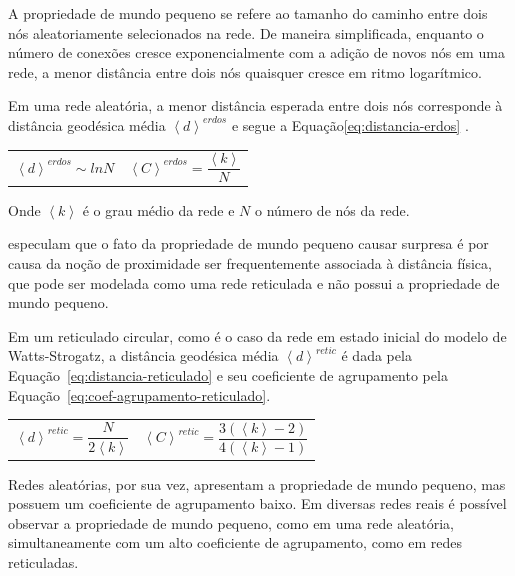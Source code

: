 \documentclass[12pt,a4paper]{article}
\theoremstyle{hypo}
\newcommand{\avg}[1]{\left\langle #1 \right\rangle} %
\begin{document}
A propriedade de mundo pequeno se refere ao tamanho do caminho entre dois nós aleatoriamente selecionados na rede. De maneira simplificada, enquanto o número de conexões cresce exponencialmente com a adição de novos nós em uma rede, a menor distância entre dois nós quaisquer cresce em ritmo logarítmico. 

Em uma rede aleatória, a menor distância esperada entre dois nós corresponde à distância geodésica média $\avg{d}^\textit{erdos}$ e segue a Equação\ref{eq:distancia-erdos} \cite{Barabasi2016-rn}.

\noindent
\begin{tabularx}{\linewidth}{@{}XX@{}}
    \begin{equation} \label{eq:distancia-erdos}
        \avg{d}^\textit{erdos} \sim ln N
    \end{equation} &
    \begin{equation} \label{eq:coef-agrupamento-erdos}
        \avg{C}^\textit{erdos} = \frac{\avg{k}}{N}
    \end{equation}
\end{tabularx}

Onde $\avg{k}$ é o grau médio da rede e $N$ o número de nós da rede.

 especulam que o fato da propriedade de mundo pequeno causar surpresa é por causa da noção de proximidade ser frequentemente associada à distância física, que pode ser modelada como uma rede reticulada e não possui a propriedade de mundo pequeno.

Em um reticulado circular, como é o caso da rede em estado inicial do modelo de Watts-Strogatz, a distância geodésica média $\avg{d}^ \textit{retic}$ é dada pela Equação~\ref{eq:distancia-reticulado} e seu coeficiente de agrupamento pela Equação~\ref{eq:coef-agrupamento-reticulado}.

\noindent
\begin{tabularx}{\linewidth}{@{}XX@{}}
    \begin{equation} \label{eq:distancia-reticulado}
        \avg{d}^\textit{retic} = \frac{N}{2\avg{k}}
    \end{equation} &
    \begin{equation} \label{eq:coef-agrupamento-reticulado}
        \avg{C}^\textit{retic} = \frac{3(\avg{k} - 2)}{4 (\avg{k} -1 )}
    \end{equation}
\end{tabularx}

Redes aleatórias, por sua vez, apresentam a propriedade de mundo pequeno, mas possuem um coeficiente de agrupamento baixo. Em diversas redes reais é possível observar a propriedade de mundo pequeno, como em uma rede aleatória, simultaneamente com um alto coeficiente de agrupamento, como em redes reticuladas.
\end{document}
